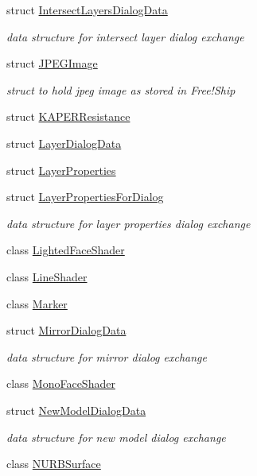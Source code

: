 \begin{DoxyCompactItemize}
struct \hyperlink{structShipCAD_1_1IntersectLayersDialogData}{Intersect\+Layers\+Dialog\+Data}
\begin{DoxyCompactList}\small\item\em data structure for intersect layer dialog exchange \end{DoxyCompactList}\item 
struct \hyperlink{structShipCAD_1_1JPEGImage}{J\+P\+E\+G\+Image}
\begin{DoxyCompactList}\small\item\em struct to hold jpeg image as stored in Free!\+Ship \end{DoxyCompactList}\item 
struct \hyperlink{structShipCAD_1_1KAPERResistance}{K\+A\+P\+E\+R\+Resistance}
\item 
struct \hyperlink{structShipCAD_1_1LayerDialogData}{Layer\+Dialog\+Data}
\item 
struct \hyperlink{structShipCAD_1_1LayerProperties}{Layer\+Properties}
\item 
struct \hyperlink{structShipCAD_1_1LayerPropertiesForDialog}{Layer\+Properties\+For\+Dialog}
\begin{DoxyCompactList}\small\item\em data structure for layer properties dialog exchange \end{DoxyCompactList}\item 
class \hyperlink{classShipCAD_1_1LightedFaceShader}{Lighted\+Face\+Shader}
\item 
class \hyperlink{classShipCAD_1_1LineShader}{Line\+Shader}
\item 
class \hyperlink{classShipCAD_1_1Marker}{Marker}
\item 
struct \hyperlink{structShipCAD_1_1MirrorDialogData}{Mirror\+Dialog\+Data}
\begin{DoxyCompactList}\small\item\em data structure for mirror dialog exchange \end{DoxyCompactList}\item 
class \hyperlink{classShipCAD_1_1MonoFaceShader}{Mono\+Face\+Shader}
\item 
struct \hyperlink{structShipCAD_1_1NewModelDialogData}{New\+Model\+Dialog\+Data}
\begin{DoxyCompactList}\small\item\em data structure for new model dialog exchange \end{DoxyCompactList}\item 
class \hyperlink{classShipCAD_1_1NURBSurface}{N\+U\+R\+B\+Surface}

\end{DoxyCompactItemize}
